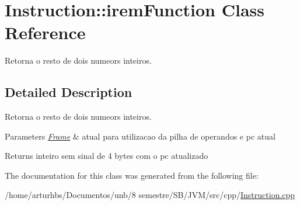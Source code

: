\hypertarget{classInstruction_1_1iremFunction}{}\section{Instruction\+:\+:irem\+Function Class Reference}
\label{classInstruction_1_1iremFunction}


Retorna o resto de dois numeors inteiros.  




\subsection{Detailed Description}
Retorna o resto de dois numeors inteiros. 


\begin{DoxyParams}{Parameters}
{\em \hyperlink{classFrame}{Frame}} & atual para utilizacao da pilha de operandos e pc atual \\
\hline
\end{DoxyParams}
\begin{DoxyReturn}{Returns}
inteiro sem sinal de 4 bytes com o pc atualizado 
\end{DoxyReturn}


The documentation for this class was generated from the following file\+:\begin{DoxyCompactItemize}
\item 
/home/arturhbs/\+Documentos/unb/8 semestre/\+S\+B/\+J\+V\+M/src/cpp/\hyperlink{Instruction_8cpp}{Instruction.\+cpp}\end{DoxyCompactItemize}
